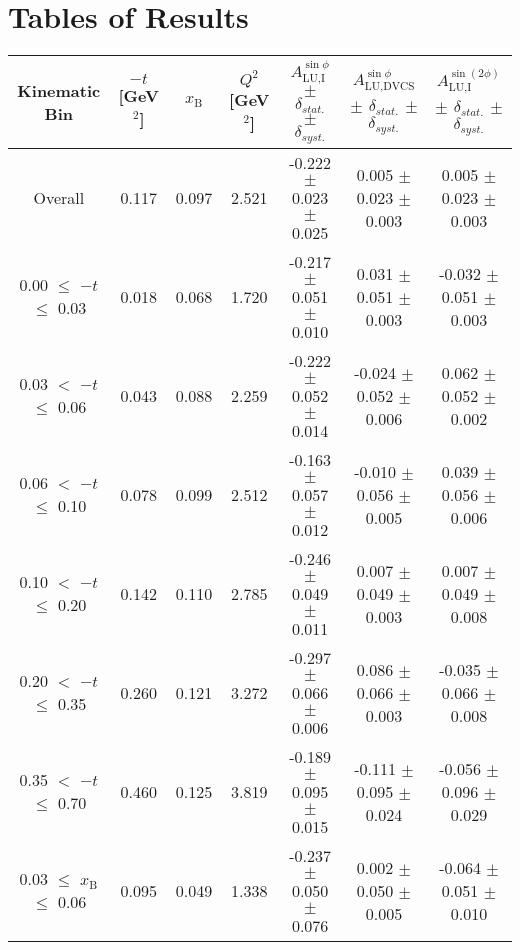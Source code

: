 \appendix
\appendixpage
\addappheadtotoc
\setcounter{equation}{0}

\section{Tables of Results}


\begin{table}[width=15cm]
 \begin{center}
\resizebox{16cm}{!} {
  \begin{tabular}{|c|c|c|c|c|c|c|}
\hline
Kinematic Bin &  $-t$ [GeV$^{2}$] & $x_{\textrm{B}}$ & $Q^{2}$ [GeV$^{2}$] & 
$A_{\textrm{LU,I}}^{\sin\phi}$ $\pm$ $\delta_{stat.}$ $\pm$ $\delta_{syst.}$ & $A_{\textrm{LU,DVCS}}^{\sin\phi}$ $\pm$ $\delta_{stat.}$ $\pm$ $\delta_{syst.}$
& $A_{\textrm{LU,I}}^{\sin(2\phi)}$ $\pm$ $\delta_{stat.}$ $\pm$ $\delta_{syst.}$ \\
\hline
\hline
Overall &  0.117 & 0.097 &  2.521 &  -0.222  $\pm$  0.023  $\pm$   0.025 &
 0.005  $\pm$  0.023  $\pm$  0.003 & 0.005  $\pm$  0.023  $\pm$   0.003 \\
\hline
0.00 $\leqslant$ $-t$ $\leqslant$ 0.03 &  0.018 & 0.068 &  1.720 &  -0.217  $\pm$  0.051  $\pm$   0.010 &
 0.031  $\pm$  0.051   $\pm$  0.003 & -0.032  $\pm$  0.051  $\pm$   0.003\\
0.03 $<$ $-t$ $\leqslant$ 0.06 &  0.043 & 0.088 &  2.259&  -0.222 $\pm$   0.052   $\pm$  0.014 &
 -0.024 $\pm$   0.052  $\pm$   0.006 & 0.062  $\pm$  0.052  $\pm$   0.002\\
0.06 $<$ $-t$ $\leqslant$ 0.10 &  0.078 & 0.099 &  2.512 & -0.163 $\pm$   0.057   $\pm$  0.012 &
 -0.010  $\pm$  0.056  $\pm$   0.005 & 0.039  $\pm$  0.056   $\pm$  0.006 \\
0.10 $<$ $-t$ $\leqslant$ 0.20 &  0.142 & 0.110 &  2.785 &  -0.246 $\pm$   0.049  $\pm$   0.011 &
0.007  $\pm$  0.049  $\pm$   0.003 & 0.007  $\pm$  0.049  $\pm$  0.008\\
0.20 $<$ $-t$ $\leqslant$ 0.35 &  0.260 & 0.121 &  3.272 &  -0.297 $\pm$   0.066  $\pm$   0.006 &
0.086  $\pm$  0.066  $\pm$   0.003 & -0.035 $\pm$   0.066   $\pm$  0.008\\
0.35 $<$ $-t$ $\leqslant$ 0.70 &  0.460 & 0.125 &  3.819 &  -0.189  $\pm$  0.095  $\pm$   0.015 & 
-0.111  $\pm$  0.095   $\pm$  0.024 & -0.056 $\pm$   0.096  $\pm$   0.029\\
\hline
0.03 $\leqslant$ $x_{\textrm{B}}$ $\leqslant$ 0.06 &  0.095 & 0.049 &  1.338 &  -0.237  $\pm$  0.050  $\pm$   0.076 &
0.002 $\pm$   0.050  $\pm$   0.005 & -0.064  $\pm$  0.051  $\pm$   0.010\\

\end{tabular}}
\end{center}
\end{table}
